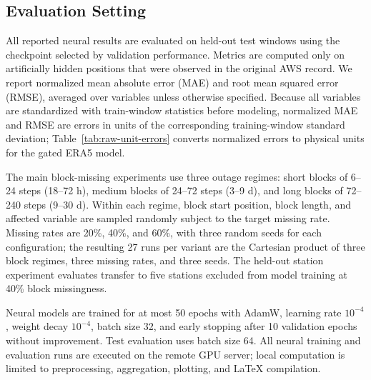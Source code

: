\subsection{Evaluation Setting}
All reported neural results are evaluated on held-out test windows using the checkpoint selected by validation performance. Metrics are computed only on artificially hidden positions that were observed in the original AWS record. We report normalized mean absolute error (MAE) and root mean squared error (RMSE), averaged over variables unless otherwise specified. Because all variables are standardized with train-window statistics before modeling, normalized MAE and RMSE are errors in units of the corresponding training-window standard deviation; Table~\ref{tab:raw-unit-errors} converts normalized errors to physical units for the gated ERA5 model.

The main block-missing experiments use three outage regimes: short blocks of 6--24 steps (18--72 h), medium blocks of 24--72 steps (3--9 d), and long blocks of 72--240 steps (9--30 d). Within each regime, block start position, block length, and affected variable are sampled randomly subject to the target missing rate. Missing rates are 20\%, 40\%, and 60\%, with three random seeds for each configuration; the resulting 27 runs per variant are the Cartesian product of three block regimes, three missing rates, and three seeds. The held-out station experiment evaluates transfer to five stations excluded from model training at 40\% block missingness.

Neural models are trained for at most 50 epochs with AdamW, learning rate $10^{-4}$, weight decay $10^{-4}$, batch size 32, and early stopping after 10 validation epochs without improvement. Test evaluation uses batch size 64. All neural training and evaluation runs are executed on the remote GPU server; local computation is limited to preprocessing, aggregation, plotting, and LaTeX compilation.

